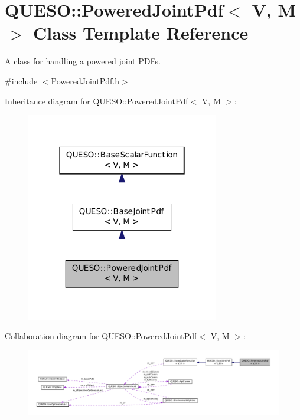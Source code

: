\hypertarget{class_q_u_e_s_o_1_1_powered_joint_pdf}{\section{Q\-U\-E\-S\-O\-:\-:Powered\-Joint\-Pdf$<$ V, M $>$ Class Template Reference}
\label{class_q_u_e_s_o_1_1_powered_joint_pdf}
}


A class for handling a powered joint P\-D\-Fs.  




{\ttfamily \#include $<$Powered\-Joint\-Pdf.\-h$>$}



Inheritance diagram for Q\-U\-E\-S\-O\-:\-:Powered\-Joint\-Pdf$<$ V, M $>$\-:
\nopagebreak
\begin{figure}[H]
\begin{center}
\leavevmode
\includegraphics[width=238pt]{class_q_u_e_s_o_1_1_powered_joint_pdf__inherit__graph}
\end{center}
\end{figure}


Collaboration diagram for Q\-U\-E\-S\-O\-:\-:Powered\-Joint\-Pdf$<$ V, M $>$\-:
\nopagebreak
\begin{figure}[H]
\begin{center}
\leavevmode
\includegraphics[width=350pt]{class_q_u_e_s_o_1_1_powered_joint_pdf__coll__graph}
\end{center}
\end{figure}
